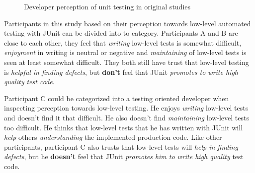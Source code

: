     \begin{figure}[ht]%
        \centering
        \qquad
        \caption{Developer perception of unit testing in original studies}%
        \label{fig:org-perception-two}%
    \end{figure}

Participants in this study based on their perception towards low-level automated testing with JUnit can be divided into
to category. Participants A and B are close to each other, they feel that
\textit{writing} low-level tests is somewhat difficult, \textit{enjoyment} in writing is neutral or negative and \textit{maintaining}
of low-level tests is seen at least somewhat difficult. They both still have trust that low-level testing is \textit{helpful in
finding defects}, but \textbf{don't} feel that JUnit \textit{promotes to write high quality test code}.

Participant C could be categorized into a testing oriented developer when inspecting perception towards
low-level testing. He enjoys \textit{writing} low-level tests and doesn't find it that difficult. He also doesn't find
\textit{maintaining} low-level tests too difficult. He thinks that low-level tests that he has written with JUnit will \textit{help} others \textit{understanding}
the implemented production code. Like other participants, participant C also trusts that low-level
tests will \textit{help in finding defects}, but he \textbf{doesn't} feel that JUnit \textit{promotes him to write high quality} test code.

